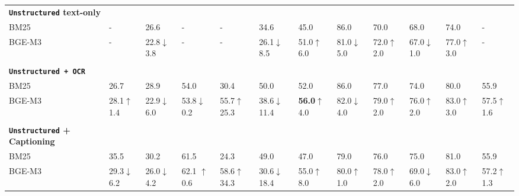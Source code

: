 \begin{table}[ht]
{\begin{tabular}{ll@{\hskip 0.5em}l@{\hskip 0.5em}l@{\hskip 0.5em}l@{\hskip 0.5em}l@{\hskip 0.5em}l@{\hskip 0.5em}l@{\hskip 0.5em}l@{\hskip 0.5em}l@{\hskip 0.5em}l|@{\hskip 0.5em}l}
    \midrule
    \multicolumn{0}{l}{\textbf{\texttt{Unstructured} \tiny text-only}}\\%
    BM25 & - & 26.6 & - & - & 34.6 & 45.0 & 86.0 & 70.0 & 68.0 & 74.0 & -  \\
    BGE-M3 & - & 22.8\textcolor{red!75!black}{\tiny $\downarrow$3.8} & - & - & 26.1\textcolor{red!75!black}{\tiny $\downarrow$8.5} & 51.0\textcolor{green!75!black}{\tiny $\uparrow$6.0} & 81.0\textcolor{red!75!black}{\tiny $\downarrow$5.0} & 72.0\textcolor{green!75!black}{\tiny $\uparrow$2.0} & 67.0\textcolor{red!75!black}{\tiny $\downarrow$1.0} & 77.0\textcolor{green!75!black}{\tiny $\uparrow$3.0} & -  \\
    \\
    \multicolumn{0}{l}{\textbf{\texttt{Unstructured \tiny+ OCR}}}\\
    BM25 & 26.7 & 28.9 & 54.0 & 30.4 & 50.0 & 52.0 & 86.0 & 77.0 & 74.0 & 80.0 & 55.9\\
    BGE-M3 & 
    28.1\textcolor{green!75!black}{\tiny $\uparrow$1.4} & 
    22.9\textcolor{red!75!black}{\tiny $\downarrow$6.0} & 53.8\textcolor{red!75!black}{\tiny $\downarrow$0.2} & 
    55.7\textcolor{green!75!black}{\tiny $\uparrow$25.3} & 
    38.6\textcolor{red!75!black}{\tiny $\downarrow$11.4} & 
    \textbf{56.0}\textcolor{green!75!black}{\tiny $\uparrow$4.0} & 82.0\textcolor{red!75!black}{\tiny $\downarrow$4.0} & 79.0\textcolor{green!75!black}{\tiny $\uparrow$2.0} & 
    76.0\textcolor{green!75!black}{\tiny $\uparrow$2.0} & 
    83.0\textcolor{green!75!black}{\tiny $\uparrow$3.0} & 
    57.5\textcolor{green!75!black}{\tiny $\uparrow$1.6}\\
    \\
    \multicolumn{0}{l}{\textbf{\texttt{Unstructured} \tiny+ Captioning}}\\
    BM25 & 35.5 & 30.2 & 61.5 & 24.3 & 49.0 & 47.0 & 79.0 & 76.0 & 75.0 & 81.0 & 55.9\\
    
    BGE-M3 & 
    29.3\textcolor{red!75!black}{\tiny $\downarrow$6.2} & 
    26.0\textcolor{red!75!black}{\tiny $\downarrow$4.2} & 
    62.1 \textcolor{green!75!black}{\tiny $\uparrow$0.6}& 
    58.6\textcolor{green!75!black}{\tiny $\uparrow$34.3} & 
    30.6\textcolor{red!75!black}{\tiny $\downarrow$18.4} & 
    55.0\textcolor{green!75!black}{\tiny $\uparrow$8.0} & 80.0\textcolor{green!75!black}{\tiny $\uparrow$1.0} & 
    78.0\textcolor{green!75!black}{\tiny $\uparrow$2.0} & 
    69.0\textcolor{red!75!black}{\tiny $\downarrow$6.0} & 
    83.0\textcolor{green!75!black}{\tiny $\uparrow$2.0} & 
    57.2\textcolor{green!75!black}{\tiny $\uparrow$1.3} \\
    \midrule


\end{tabular}}
\end{table}
